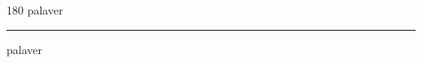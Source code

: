 
\begin{frame}
\begin{center}
\begin{turn}{180}
{\fontsize{2.5cm}{1em}\selectfont palaver}
\end{turn}
\vspace{1em}\par  
\hrule
\vspace{1em}\par  
{\fontsize{2.5cm}{1em}\selectfont palaver}
\end{center}
\end{frame}
